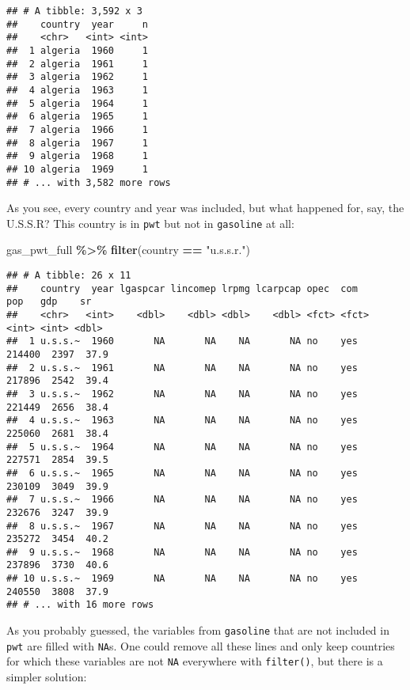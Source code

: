 \documentclass[
]{article}
\newenvironment{Shaded}{\begin{snugshade}}{\end{snugshade}}
\newcommand{\KeywordTok}[1]{\textcolor[rgb]{0.13,0.29,0.53}{\textbf{#1}}}
\newcommand{\NormalTok}[1]{#1}
\newcommand{\OperatorTok}[1]{\textcolor[rgb]{0.81,0.36,0.00}{\textbf{#1}}}
\newcommand{\StringTok}[1]{\textcolor[rgb]{0.31,0.60,0.02}{#1}}
\begin{document}
\begin{verbatim}
## # A tibble: 3,592 x 3
##    country  year     n
##    <chr>   <int> <int>
##  1 algeria  1960     1
##  2 algeria  1961     1
##  3 algeria  1962     1
##  4 algeria  1963     1
##  5 algeria  1964     1
##  6 algeria  1965     1
##  7 algeria  1966     1
##  8 algeria  1967     1
##  9 algeria  1968     1
## 10 algeria  1969     1
## # ... with 3,582 more rows
\end{verbatim}

As you see, every country and year was included, but what happened for, say, the U.S.S.R? This country
is in \texttt{pwt} but not in \texttt{gasoline} at all:

\begin{Shaded}
\begin{Highlighting}[]
\NormalTok{gas\_pwt\_full }\OperatorTok{\%\textgreater{}\%}
\StringTok{  }\KeywordTok{filter}\NormalTok{(country }\OperatorTok{==}\StringTok{ "u.s.s.r."}\NormalTok{)}
\end{Highlighting}
\end{Shaded}

\begin{verbatim}
## # A tibble: 26 x 11
##    country  year lgaspcar lincomep lrpmg lcarpcap opec  com      pop   gdp    sr
##    <chr>   <int>    <dbl>    <dbl> <dbl>    <dbl> <fct> <fct>  <int> <int> <dbl>
##  1 u.s.s.~  1960       NA       NA    NA       NA no    yes   214400  2397  37.9
##  2 u.s.s.~  1961       NA       NA    NA       NA no    yes   217896  2542  39.4
##  3 u.s.s.~  1962       NA       NA    NA       NA no    yes   221449  2656  38.4
##  4 u.s.s.~  1963       NA       NA    NA       NA no    yes   225060  2681  38.4
##  5 u.s.s.~  1964       NA       NA    NA       NA no    yes   227571  2854  39.5
##  6 u.s.s.~  1965       NA       NA    NA       NA no    yes   230109  3049  39.9
##  7 u.s.s.~  1966       NA       NA    NA       NA no    yes   232676  3247  39.9
##  8 u.s.s.~  1967       NA       NA    NA       NA no    yes   235272  3454  40.2
##  9 u.s.s.~  1968       NA       NA    NA       NA no    yes   237896  3730  40.6
## 10 u.s.s.~  1969       NA       NA    NA       NA no    yes   240550  3808  37.9
## # ... with 16 more rows
\end{verbatim}

As you probably guessed, the variables from \texttt{gasoline} that are not included in \texttt{pwt} are filled with
\texttt{NA}s. One could remove all these lines and only keep countries for which these variables are not
\texttt{NA} everywhere with \texttt{filter()}, but there is a simpler solution:
\end{document}
